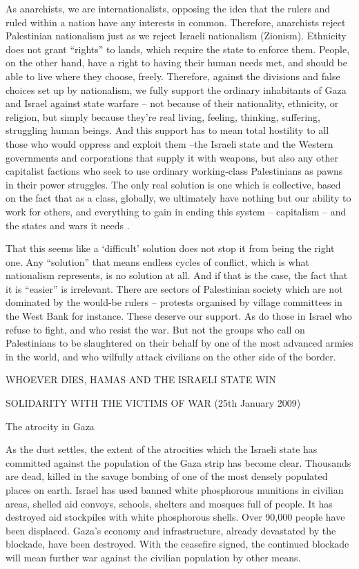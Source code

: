 As anarchists, we are internationalists, opposing the idea that the rulers and ruled within
a nation have any interests in common.
Therefore, anarchists reject Palestinian nationalism
just as we reject Israeli nationalism (Zionism).
Ethnicity does not grant “rights” to
lands, which require the state to enforce them.
People, on the other hand, have a right to
having their human needs met, and should be able to live where they choose, freely.
Therefore, against the divisions and false choices set up by nationalism, we fully support
the ordinary inhabitants of Gaza and Israel against state warfare – not because of
their nationality, ethnicity, or religion, but simply because they’re real living, feeling,
thinking, suffering, struggling human beings.
And this support has to mean total hostility
to all those who would oppress and exploit them –the Israeli state and the Western
governments and corporations that supply it with weapons, but also any other capitalist
factions who seek to use ordinary working-class Palestinians as pawns in their power
struggles.
The only real solution is one which is collective, based on the fact that as a
class, globally, we ultimately have nothing but our ability to work for others, and everything
to gain in ending this system – capitalism – and the states and wars it needs .

That this seems like a ‘difficult’ solution does not stop it from being the right one.
Any
“solution” that means endless cycles of conflict, which is what nationalism represents, is
no solution at all.
And if that is the case, the fact that it is “easier” is irrelevant.
There are
sectors of Palestinian society which are not dominated by the would-be rulers – protests
organised by village committees in the West Bank for instance.
These deserve our support.
As do those in Israel who refuse to fight, and who resist the war.
But not the groups
who call on Palestinians to be slaughtered on their behalf by one of the most advanced
armies in the world, and who wilfully attack civilians on the other side of the border.

WHOEVER DIES, HAMAS AND THE ISRAELI STATE WIN

SOLIDARITY WITH THE VICTIMS OF WAR (25th January 2009)

The atrocity in Gaza

As the dust settles, the extent of the atrocities which the Israeli state has committed
against the population of the Gaza strip has become clear.
Thousands are dead,
killed in the savage bombing of one of the most densely populated places on earth.
Israel
has used banned white phosphorous munitions in civilian areas, shelled aid convoys,
schools, shelters and mosques full of people.
It has destroyed aid stockpiles with white
phosphorous shells.
Over 90,000 people have been displaced.
Gaza’s economy and infrastructure,
already devastated by the blockade, have been destroyed.
With the ceasefire
signed, the continued blockade will mean further war against the civilian population by
other means.


